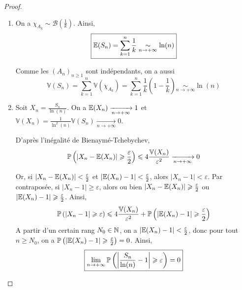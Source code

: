 \documentclass[12pt]{article}
\begin{document}
\begin{proof}
    \phantom{}
    \begin{enumerate}
        \item On a $\chi_{A_{k}}\sim\mathcal{B}\left(\frac{1}{k}\right)$. Ainsi,
        \begin{equation}
            \boxed{\E(S_{n})=\sum_{k=1}^{n}\frac{1}{k}\underset{n\to+\infty}{\sim}\ln(n)}
        \end{equation}

        Comme les $(A_{n})_{n\geqslant1}$ sont indépendants, on a aussi 
        \begin{equation}
            \boxed{\mathbb{V}(S_{n})=\sum_{k=1}^{n}\mathbb{V}(\chi_{A_{k}})=\sum_{k=1}^{n}\frac{1}{k}\left(1-\frac{1}{k}\right)\underset{n\to+\infty}{\sim}\ln(n)}
        \end{equation}

        \item Soit $X_{n}=\frac{S_{n}}{\ln(n)}$. On a $\E(X_{n})\xrightarrow[n\to+\infty]{}1$ et $\mathbb{V}(X_{n})=\frac{1}{\ln^{2}(n)}\mathbb{V}(S_{n})\xrightarrow[n\to+\infty]{}0$.
        
        D'après l'inégalité de Bienaymé-Tchebychev,
        \begin{equation}
            \P\left(\left\lvert X_{n}-\E(X_{n})\right\rvert\geqslant\frac{\varepsilon}{2}\right)\leqslant4\frac{\mathbb{V}(X_{n})}{\varepsilon^{2}}\xrightarrow[n\to+\infty]{}0
        \end{equation}

        Or, si $\left\lvert X_{n}-\E(X_{n})\right\rvert<\frac{\varepsilon}{2}$ et $\left\lvert\E(X_{n})-1\right\rvert<\frac{\varepsilon}{2}$, alors $\left\lvert X_{n}-1\right\rvert<\varepsilon$.
        Par contraposée, si $\left\lvert X_{n}-1\right\rvert\geqslant\varepsilon$, alors ou bien $\left\lvert X_{n}-\E(X_{n})\right\rvert\geqslant\frac{\varepsilon}{2}$ ou $\left\lvert\E(X_{n})-1\right\rvert\geqslant\frac{\varepsilon}{2}$. Ainsi,
        \begin{equation}
            \P\left(\left\lvert X_{n}-1\right\rvert\geqslant\varepsilon\right)\leqslant4\frac{\mathbb{V}(X_{n})}{\varepsilon^{2}}+\P\left(\left\lvert\E(X_{n})-1\right\rvert\geqslant\frac{\varepsilon}{2}\right)
        \end{equation}
        A partir d'un certain rang $N_{0}\in\N$, on a $\left\lvert\E(X_{n})-1\right\rvert<\frac{\varepsilon}{2}$, donc pour tout $n\geqslant N_{0}$, on a $\P\left(\left\lvert\E(X_{n})-1\right\rvert\geqslant\frac{\varepsilon}{2}\right)=0$. Ainsi,
        \begin{equation}
            \boxed{\lim\limits_{n\to+\infty}\P\left(\left\lvert\frac{S_{n}}{\ln(n)}-1\right\rvert\geqslant\varepsilon\right)=0}
        \end{equation}
    \end{enumerate}
\end{proof}
\end{document}
